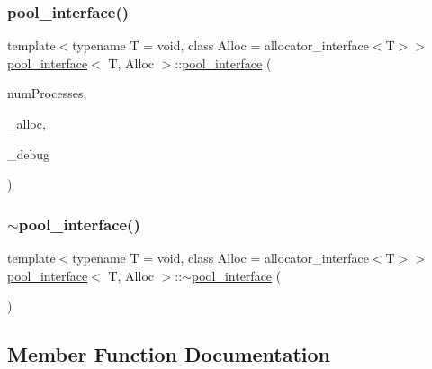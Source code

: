 \subsubsection{\texorpdfstring{pool\+\_\+interface()}{pool\_interface()}}
{\footnotesize\ttfamily template$<$typename T  = void, class Alloc  = allocator\+\_\+interface$<$\+T$>$$>$ \\
\hyperlink{classpool__interface}{pool\+\_\+interface}$<$ T, Alloc $>$\+::\hyperlink{classpool__interface}{pool\+\_\+interface} (\begin{DoxyParamCaption}\item[{const int}]{num\+Processes,  }\item[{Alloc $\ast$const}]{\+\_\+alloc,  }\item[{\hyperlink{classdebugInfo}{debug\+Info} $\ast$const}]{\+\_\+debug }\end{DoxyParamCaption})\hspace{0.3cm}{\ttfamily [inline]}}

\mbox{\label{classpool__interface_a4d7a8d3165eb068452c71e31dab81a18}} 
\subsubsection{\texorpdfstring{$\sim$pool\+\_\+interface()}{~pool\_interface()}}
{\footnotesize\ttfamily template$<$typename T  = void, class Alloc  = allocator\+\_\+interface$<$\+T$>$$>$ \\
\hyperlink{classpool__interface}{pool\+\_\+interface}$<$ T, Alloc $>$\+::$\sim$\hyperlink{classpool__interface}{pool\+\_\+interface} (\begin{DoxyParamCaption}{ }\end{DoxyParamCaption})\hspace{0.3cm}{\ttfamily [inline]}}



\subsection{Member Function Documentation}
\mbox{\label{classpool__interface_a40c3fd4f6e9fad87c1230b511e630649}} 
